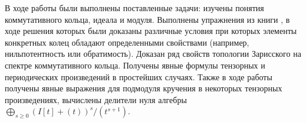 В ходе работы были выполнены поставленные задачи: изучены понятия коммутативного кольца, идеала и модуля. Выполнены упражнения из
книги \cite{A-M}, в ходе решения которых были доказаны различные условия при которых элементы конкретных колец 
обладают определенными свойствами (например, нильпотентность или обратимость). 
Доказан ряд свойств топологии Зарисского на спектре коммутативного кольца. 
Получены явные формулы тензорных и периодических произведений в простейших случаях.
Также в ходе работы получены явные выражения для подмодуля кручения в некоторых тензорных произведениях,
вычислены делители нуля алгебры $\bigoplus_{s \geq 0}{(I[t] + (t))^s / (t^{s + 1})}$.